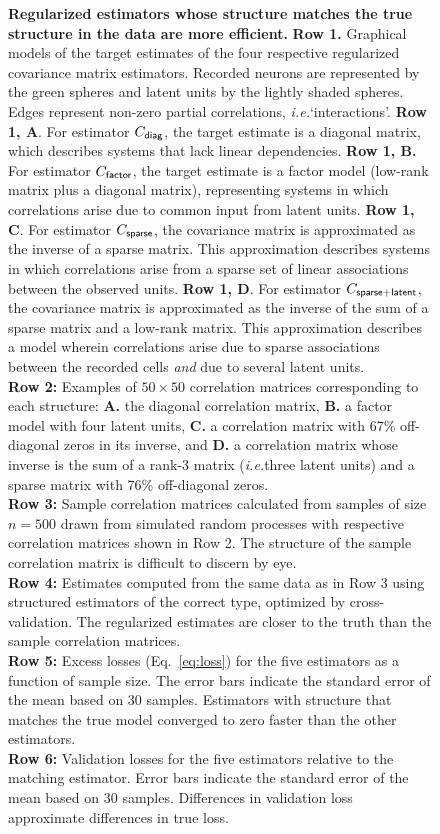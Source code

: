 \begin{figure}
\caption{
{\bf Regularized estimators whose structure matches the true structure in the data are more efficient.}
     {\bf Row 1.} Graphical models of the target estimates of the four respective regularized covariance matrix estimators.  Recorded neurons are represented by the green spheres and latent units by the lightly shaded spheres.  Edges represent non-zero partial correlations, \emph{i.e.}\;`interactions'.
     {\bf Row 1, A}.  For estimator $C_{\sf diag}$, the target estimate is a diagonal matrix, which describes systems that lack linear dependencies.
     {\bf  Row 1, B.} For estimator $C_{\sf factor}$, the target estimate is a factor model (low-rank matrix plus a diagonal matrix), representing systems in which correlations arise due to common input from latent units.
     {\bf  Row 1, C}. For estimator $C_{\sf sparse}$, the covariance matrix is approximated as the inverse of a sparse matrix. This approximation describes systems in which correlations arise from a sparse set of  linear associations between the observed units.
     {\bf  Row 1, D}.  For estimator $C_{\sf sparse+latent}$, the covariance matrix is approximated as the inverse of the sum of a sparse matrix and a low-rank matrix. This approximation describes a model wherein correlations arise due to sparse associations between the recorded cells \emph{and} due to several latent units.
     \\
     {\bf Row 2:} Examples of $50\times 50$ correlation matrices corresponding to each structure: {\bf A.} the diagonal correlation matrix, {\bf B.} a factor model with four latent units, {\bf C.}  a correlation matrix with 67\%  off-diagonal zeros in its inverse, and {\bf  D.} a correlation matrix whose inverse is the sum of a rank-3 matrix (\emph{i.e.}\;three latent units) and a sparse matrix with 76\% off-diagonal zeros.
     \\
{\bf Row 3:} Sample correlation matrices calculated from samples of size $n=500$ drawn from simulated random processes with respective correlation matrices shown in Row 2.  The structure of the sample correlation matrix is difficult to discern by eye.
     \\
{\bf Row 4:} Estimates computed from the same data as in Row 3 using structured estimators of the correct type, optimized by cross-validation.  The regularized estimates are closer to the truth than the sample correlation matrices.
     \\
{\bf Row 5:} Excess losses (Eq.~\ref{eq:loss}) for the five estimators as a function of sample size. The error bars indicate the standard error of the mean based on 30 samples.  Estimators with structure that matches the true model converged to zero faster than the other estimators.
     \\
{\bf Row 6:} Validation losses for the five estimators relative to the matching estimator. Error bars indicate the standard error of the mean based on 30 samples.  Differences in validation loss approximate differences in true loss.
}
\label{fig:1}
\end{figure}


